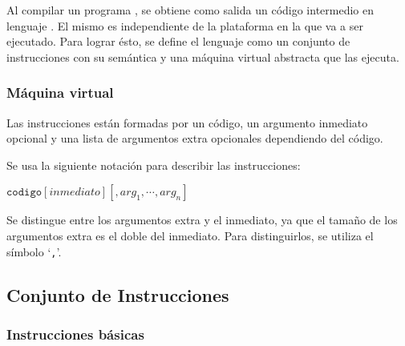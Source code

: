   Al compilar un programa \frob{}, se obtiene como salida un código
intermedio en lenguaje \alf{}.
  El mismo es independiente de la plataforma en la que va a ser ejecutado.
  Para lograr ésto, se define el lenguaje como un conjunto de instrucciones
con su semántica y una máquina virtual abstracta que las ejecuta.



\subsubsection{Máquina virtual}



  Las instrucciones están formadas por un código, un argumento inmediato
  opcional y una lista de argumentos extra opcionales dependiendo del
  código.

  Se usa la siguiente notación para describir las instrucciones:
  \begin{center}
    $\texttt{codigo} [\textit{inmediato}] [, {arg}_1, \dotsb, {arg}_n ]$
  \end{center}

   Se distingue entre los argumentos extra y el inmediato, ya que el
   tamaño de los argumentos extra es el doble del inmediato.
   Para distinguirlos, se utiliza el símbolo `\texttt{,}'.

\subsection{Conjunto de Instrucciones}

\subsubsection{Instrucciones básicas}


